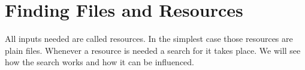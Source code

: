 
\section{Finding Files and Resources}

All inputs needed are called resources. In the simplest case those
resources are plain files. Whenever a resource is needed a search for
it takes place. We will see how the search works and how it can be
influenced.

\INCOMPLETE


\endinput
%
